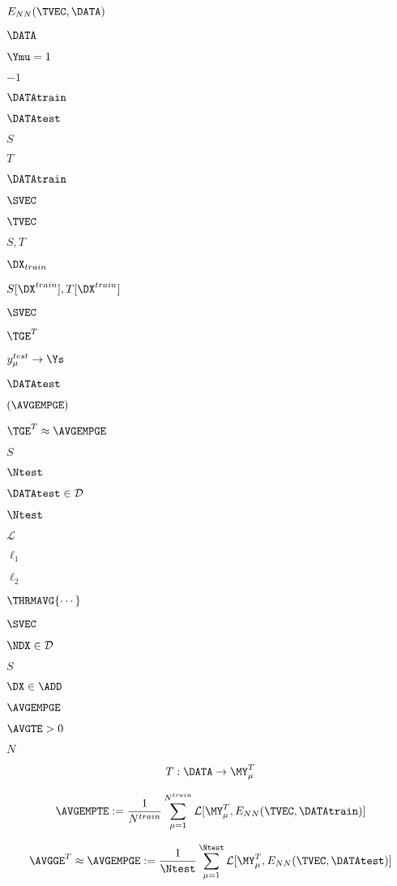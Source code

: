 $E_{NN}(\TVEC,\DATA )$

$\DATA$

$\Ymu=1$

$-1$

$\DATAtrain$

$\DATAtest$

$S$

$T$

$\DATAtrain$

$\SVEC$

$\TVEC$

$S,T$

$\DX_{train}$

$S[\DX^{train}], T[\DX^{train}]$

$\SVEC$

$\TGE^{T}$

$y_{\mu}^{test}\rightarrow \Ys$

$\DATAtest$

$(\AVGEMPGE)$

$\TGE^{T}\approx\AVGEMPGE$

$S$

$\Ntest$

$\DATAtest\in\mathcal{D}$

$\Ntest$

$\mathcal{L}$

$\ell_1$

$\ell_2$

$\THRMAVG{\cdots}$

$\SVEC$

$\NDX\in\mathcal{D}$

$S$

$\DX\in\ADD$

$\AVGEMPGE$

$\AVGTE > 0$

$N$

\begin{align}
 T:\DATA\rightarrow \MY^{T}_{\mu}
\end{align}

\begin{align}
\label{eqn:Eg_train}
\AVGEMPTE:= \frac{1}{N^{train}}\sum_{\mu=1}^{N^{train}}\mathcal{L}[\MY^{T}_{\mu},E_{NN}(\TVEC,\DATAtrain)]
\end{align}

\begin{align}
\label{eqn:Eg_test}
 \AVGGE^{T}\approx \AVGEMPGE:= \frac{1}{\Ntest}\sum_{\mu=1}^{\Ntest}\mathcal{L}[\MY^{T}_{\mu},E_{NN}(\TVEC,\DATAtest)]
\end{align}

